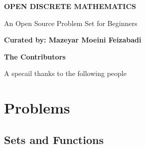 \documentclass[addpoints]{exam}
\begin{document}
	
\begin{titlepage}
	\begin{center}
		\vspace*{1cm}
		
		\textbf{\Huge OPEN DISCRETE MATHEMATICS}
		
		\vspace{4cm}
		
		
		\vspace{0.5cm}
		{\LARGE An Open Source Problem Set for Beginners}
		
		\vspace{3cm}
		
		\textbf{Curated by: Mazeyar Moeini Feizabadi}
		
		
	\end{center}
\end{titlepage}	

\begin{titlepage}

	
		
	\vspace{4cm}
	
	\textbf{\huge The Contributors}
	
	\vspace{0.5cm}
	{\LARGE A specail thanks to the following people}
	
	\vspace{1cm}
	
	\vspace{0.2cm}
	
	\vspace{0.2cm}
	
	\vspace{0.2cm}
	
	\vspace{0.2cm}
	
		
\end{titlepage}	
	
	
\section{\Huge Problems}
\subsection{\huge Sets and Functions}
\end{document}
